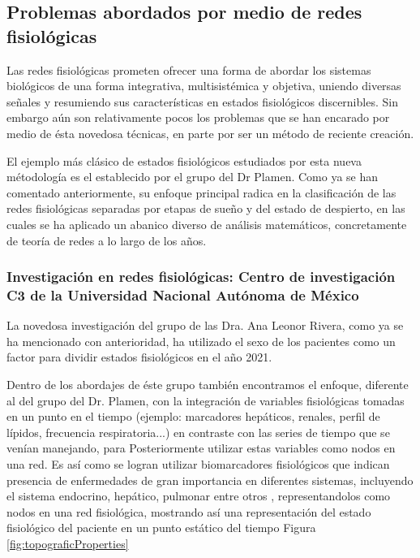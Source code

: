 \documentclass[twoside,twocolumn]{article}
\begin{document}
\subsection{Problemas abordados por medio de redes fisiológicas}
Las redes fisiológicas prometen ofrecer una forma de abordar los sistemas biológicos de una forma integrativa, multisistémica y objetiva, uniendo diversas señales y resumiendo sus características en estados fisiológicos discernibles\cite{ivanov2016focus}.
Sin embargo aún son relativamente pocos los problemas que se han encarado por medio de ésta novedosa técnicas, en parte por ser un método de reciente creación.

El ejemplo más clásico de estados fisiológicos estudiados por esta nueva métodología es el establecido por el grupo del Dr Plamen.
Como ya se han comentado anteriormente, su enfoque principal radica en la clasificación de las redes fisiológicas separadas por etapas de sueño y del estado de despierto, en las cuales se ha aplicado un abanico diverso de análisis matemáticos, concretamente de teoría de redes a lo largo de los años\cite{bashan2012network}\cite{lin2020dynamic}.

\subsubsection{Investigación en redes fisiológicas: Centro de investigación C3 de la Universidad Nacional Autónoma de México}
La novedosa investigación del grupo de las Dra. Ana Leonor Rivera, como ya se ha mencionado con anterioridad, ha utilizado el sexo de los pacientes como un factor para dividir estados fisiológicos en el año 2021\cite{barajas2021sex}.

Dentro de los abordajes de éste grupo también encontramos el enfoque, diferente al del grupo del Dr. Plamen, con la integración de variables fisiológicas tomadas en un punto en el tiempo (ejemplo: marcadores hepáticos, renales, perfil de lípidos, frecuencia respiratoria...) en contraste con las series de tiempo que se venían manejando, para Posteriormente utilizar estas variables como nodos en una red.
Es así como se logran utilizar biomarcadores fisiológicos que indican presencia de enfermedades de gran importancia en diferentes sistemas, incluyendo el sistema endocrino, hepático, pulmonar entre otros \cite{barajas2021physiological}, representandolos como nodos en una red fisiológica, mostrando así una representación del estado fisiológico del paciente en un punto estático del tiempo Figura \ref{fig:topograficProperties}
\end{document}
